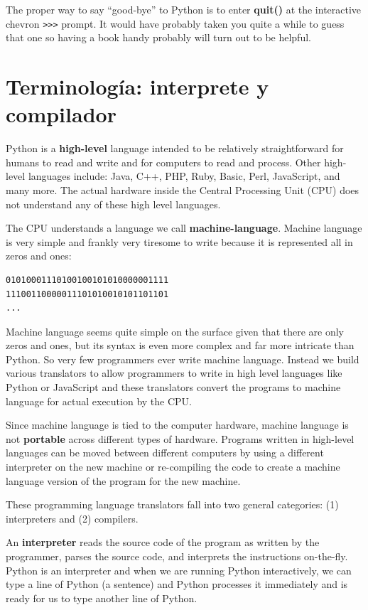 The proper way to say ``good-bye'' to Python is to enter 
{\bf quit()} at the interactive chevron {\tt >>>} prompt.
It would have probably taken you quite a while to guess that 
one so having a book handy probably will turn out 
to be helpful.

\section{Terminolog\'ia: interprete y compilador}

Python is a {\bf high-level} language intended to be relatively
straightforward for humans to read and write and for computers
to read and process.  Other high-level languages include: Java, C++,
PHP, Ruby, Basic, Perl, JavaScript, and many more.  The actual hardware
inside the Central Processing Unit (CPU) does not understand any
of these high level languages.

The CPU understands a language we call {\bf machine-language}.  Machine
language is very simple and frankly very tiresome to write because it 
is represented all in zeros and ones:

\beforeverb
\begin{verbatim}
01010001110100100101010000001111
11100110000011101010010101101101
...
\end{verbatim}
\afterverb
%
Machine language seems quite simple on the surface given that there 
are only zeros and ones, but its syntax is even more complex
and far more intricate than Python.  So very few programmers ever write
machine language.  Instead we build various translators to allow
programmers to write in high level languages like Python or JavaScript
and these translators convert the programs to machine language for actual
execution by the CPU.

Since machine language is tied to the computer hardware, machine language
is not {\bf portable} across different types of hardware.  Programs written in 
high-level languages can be moved between different computers by using a 
different interpreter on the new machine or re-compiling the code to create
a machine language version of the program for the new machine.

These programming language translators fall into two general categories:
(1) interpreters and (2) compilers.

An {\bf interpreter} reads the source code of the program as written by the
programmer, parses the source code, and interprets the instructions on-the-fly.
Python is an interpreter and when we are running Python interactively, 
we can type a line of Python (a sentence) and Python processes it immediately
and is ready for us to type another line of Python.   

